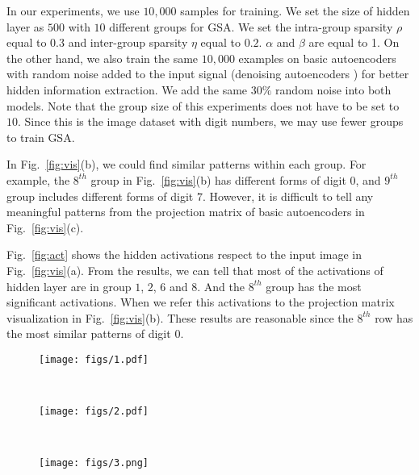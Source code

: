 In our experiments, we use $10,000$ samples for training. We set the size of hidden layer as $500$ with $10$ different groups for GSA. We set the intra-group sparsity $\rho$ equal to $0.3$ and inter-group sparsity $\eta$ equal to $0.2$. $\alpha$ and $\beta$ are equal to 1. On the other hand, we also train the same $10,000$ examples on basic autoencoders with random noise added to the input signal (denoising autoencoders \cite{VincentPLarochelleH2008}) for better hidden information extraction. We add the same $30\%$ random noise into both models. Note that the group size of this experiments does not have to be set to $10$. Since this is the image dataset with digit numbers, we may use fewer groups to train GSA.

In Fig.~\ref{fig:vis}(b), we could find similar patterns within each group. For example, the $8^{th}$ group in Fig.~\ref{fig:vis}(b) has different forms of digit $0$, and $9^{th}$ group includes different forms of digit $7$. However, it is difficult to tell any meaningful patterns from the projection matrix of basic autoencoders in Fig.~\ref{fig:vis}(c). 

Fig.~\ref{fig:act} shows the hidden activations respect to the input image in Fig.~\ref{fig:vis}(a). From the results, we can tell that most of the activations of hidden layer are in group $1$, $2$, $6$ and $8$. And the $8^{th}$ group has the most significant activations. When we refer this activations to the projection matrix visualization in Fig.~\ref{fig:vis}(b). These results are reasonable since the $8^{th}$ row has the most similar patterns of digit $0$. 

\begin{figure*}
    \centering
    \begin{subfigure}[b]{0.2\textwidth}
        \texttt{[image: figs/1.pdf]}
        \caption{}
        \label{fig:gull}
    \end{subfigure}
    ~ %
    \begin{subfigure}[b]{0.3\textwidth}
        \texttt{[image: figs/2.pdf]}
        \caption{}
        \label{fig:tiger}
    \end{subfigure}
    ~ %
    \begin{subfigure}[b]{0.2\textwidth}
        \texttt{[image: figs/3.png]}
        \caption{}
        \label{fig:mouse}
    \end{subfigure}
    \caption{\small The input figure with hand written digit $0$ is shown in (a). Figure (b) is the visualization of projection matrix $W$. Different rows represent different groups of $W$ in Eq.~\ref{eq:loss_sgl}. For each group, we only show the first $15$ (out of $50$) bases. The red numbers on the left side of (b) are the index of different groups(10 groups in total). Figure (c) is the projection matrix visualization from a basic autoencoders.}\label{fig:vis}
\end{figure*}



